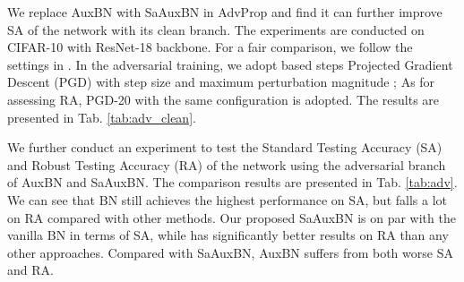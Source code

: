\documentclass{article}
\begin{document}
We replace AuxBN with SaAuxBN in AdvProp \citep{xie2019adversarial} and find it can further improve SA of the network with its clean branch. The experiments are conducted on CIFAR-10 \citep{krizhevsky2009learning} with ResNet-18 \citep{he2016deep} backbone. For a fair comparison, we follow the settings in \cite{madry2017towards}. In the adversarial training, we adopt  based  steps Projected Gradient Descent (PGD) \citep{madry2017towards} with step size  and maximum perturbation magnitude ; As for assessing RA, PGD-20 with the same configuration is adopted. The results are presented in Tab. \ref{tab:adv_clean}. 
\begin{table}[t]
\caption{Model performance (SA) using clean branch.}
\label{tab:adv_clean}
\vspace{4pt}
\centering
{}
\end{table}

\begin{table}[t!]
\caption{Model performance (SA\&RA) using the adversarial branch.} 
\label{tab:adv}
\vspace{4pt}
\centering
{}
\end{table}
We further conduct an experiment to test the Standard Testing Accuracy (SA) and Robust Testing Accuracy (RA) of the network using the adversarial branch of AuxBN and SaAuxBN. The comparison results are presented in Tab. \ref{tab:adv}. 
We can see that BN still achieves the highest performance on SA, but falls a lot on RA compared with other methods. Our proposed SaAuxBN is on par with the vanilla BN in terms of SA, while has significantly better results on RA than any other approaches. Compared with SaAuxBN, AuxBN suffers from both worse SA and RA.
\end{document}
